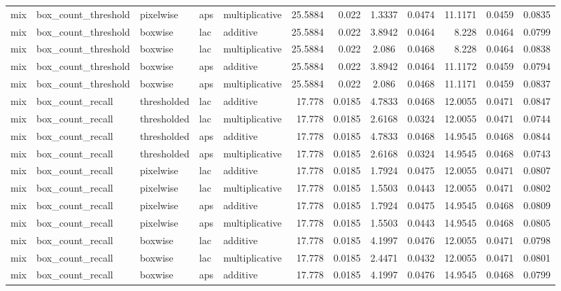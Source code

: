 \begin{table*}[htbp]
\begin{tabular}{@{}lllll rrcrrcr@{}}
mix & box\_count\_threshold & pixelwise & aps & multiplicative & 25.5884 & 0.022 & 1.3337 & 0.0474 & 11.1171 & 0.0459 & 0.0835 \\
mix & box\_count\_threshold & boxwise & lac & additive & 25.5884 & 0.022 & 3.8942 & 0.0464 & 8.228 & 0.0464 & 0.0799 \\
mix & box\_count\_threshold & boxwise & lac & multiplicative & 25.5884 & 0.022 & 2.086 & 0.0468 & 8.228 & 0.0464 & 0.0838 \\
mix & box\_count\_threshold & boxwise & aps & additive & 25.5884 & 0.022 & 3.8942 & 0.0464 & 11.1172 & 0.0459 & 0.0794 \\
mix & box\_count\_threshold & boxwise & aps & multiplicative & 25.5884 & 0.022 & 2.086 & 0.0468 & 11.1171 & 0.0459 & 0.0837 \\
mix & box\_count\_recall & thresholded & lac & additive & 17.778 & 0.0185 & 4.7833 & 0.0468 & 12.0055 & 0.0471 & 0.0847 \\
mix & box\_count\_recall & thresholded & lac & multiplicative & 17.778 & 0.0185 & 2.6168 & 0.0324 & 12.0055 & 0.0471 & 0.0744 \\
mix & box\_count\_recall & thresholded & aps & additive & 17.778 & 0.0185 & 4.7833 & 0.0468 & 14.9545 & 0.0468 & 0.0844 \\
mix & box\_count\_recall & thresholded & aps & multiplicative & 17.778 & 0.0185 & 2.6168 & 0.0324 & 14.9545 & 0.0468 & 0.0743 \\
mix & box\_count\_recall & pixelwise & lac & additive & 17.778 & 0.0185 & 1.7924 & 0.0475 & 12.0055 & 0.0471 & 0.0807 \\
mix & box\_count\_recall & pixelwise & lac & multiplicative & 17.778 & 0.0185 & 1.5503 & 0.0443 & 12.0055 & 0.0471 & 0.0802 \\
mix & box\_count\_recall & pixelwise & aps & additive & 17.778 & 0.0185 & 1.7924 & 0.0475 & 14.9545 & 0.0468 & 0.0809 \\
mix & box\_count\_recall & pixelwise & aps & multiplicative & 17.778 & 0.0185 & 1.5503 & 0.0443 & 14.9545 & 0.0468 & 0.0805 \\
mix & box\_count\_recall & boxwise & lac & additive & 17.778 & 0.0185 & 4.1997 & 0.0476 & 12.0055 & 0.0471 & 0.0798 \\
mix & box\_count\_recall & boxwise & lac & multiplicative & 17.778 & 0.0185 & 2.4471 & 0.0432 & 12.0055 & 0.0471 & 0.0801 \\
mix & box\_count\_recall & boxwise & aps & additive & 17.778 & 0.0185 & 4.1997 & 0.0476 & 14.9545 & 0.0468 & 0.0799 \\

\end{tabular}
\end{table*}
